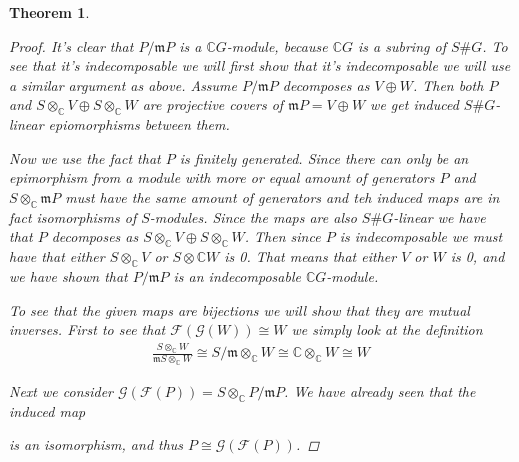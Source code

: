 \documentclass[11pt, a4paper, english]{article}
\numberwithin{prop}{section}
\numberwithin{lemma}{section}
\newtheorem{theorem}{Theorem}
\numberwithin{theorem}{section}
\numberwithin{defin}{section}
\numberwithin{example}{section}
\newcommand{\C}{\mathbb{C}}
\begin{document}
\begin{theorem}
\begin{proof}
It's clear that $P/\mathfrak{m}P$ is a $\C G$-module, because $\C G$ is a subring of $S\#G$. To see that it's indecomposable we will first show that it's indecomposable we will use a similar argument as above. Assume $P/\mathfrak{m}P$ decomposes as $V \oplus W$. Then both $P$ and $S\otimes_\C V \oplus S \otimes_\C W$ are projective covers of $\mathfrak{m}P = V\oplus W$ we get induced $S\#G$-linear epiomorphisms between them.

\begin{center}
\end{center}

Now we use the fact that $P$ is finitely generated. Since there can only be an epimorphism from a module with more or equal amount of generators $P$ and $S\otimes_\C \mathfrak{m}P$ must have the same amount of generators and teh induced maps are in fact isomorphisms of $S$-modules. Since the maps are also $S\#G$-linear we have that $P$ decomposes as $S\otimes_\C V \oplus S \otimes_\C W$. Then since $P$ is indecomposable we must have that either $S \otimes_\C V$ or $S\otimes\C W$ is 0. That means that either $V$ or $W$ is 0, and we have shown that $P/\mathfrak{m}P$ is an indecomposable $\C G$-module.

To see that the given maps are bijections we will show that they are mutual inverses. First to see that $\mathcal{F}(\mathcal{G}(W)) \cong W$ we simply look at the definition
\begin{equation*}
\begin{split}
\frac{S \otimes_\C W}{\mathfrak{m}S \otimes_\C W} \cong S/\mathfrak{m} \otimes_\C W \cong \C \otimes_\C W \cong W
\end{split}
\end{equation*}

Next we consider $\mathcal{G}(\mathcal{F}(P)) = S \otimes_\C P/\mathfrak{m}P$. We have already seen that the induced map
\begin{center}
\end{center}
is an isomorphism, and thus $P \cong \mathcal{G}(\mathcal{F}(P))$.
\end{proof}


\end{theorem}
\end{document}
